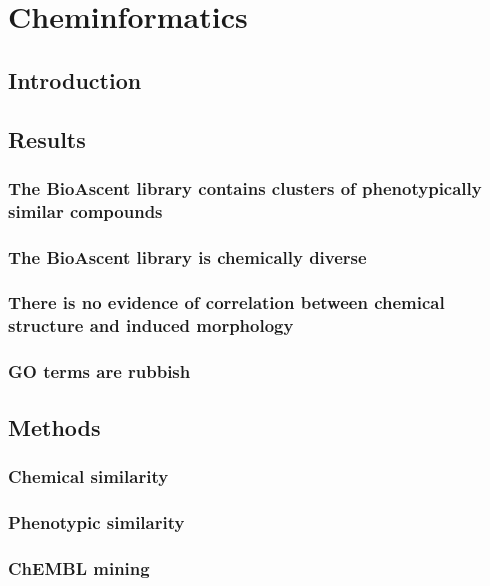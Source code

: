 \documentclass[a4paper,11pt,twoside,openright]{scrbook}
\begin{document}
\chapter{Cheminformatics} \label{chapter:cheminformatics}

\section{Introduction}




\section{Results}

\subsection{The BioAscent library contains clusters of phenotypically similar compounds}

\subsection{The BioAscent library is chemically diverse}

\subsection{There is no evidence of correlation between chemical structure and induced morphology}

\subsection{GO terms are rubbish}

\section{Methods}

\subsection{Chemical similarity}

\subsection{Phenotypic similarity}

\subsection{ChEMBL mining}
\end{document}
